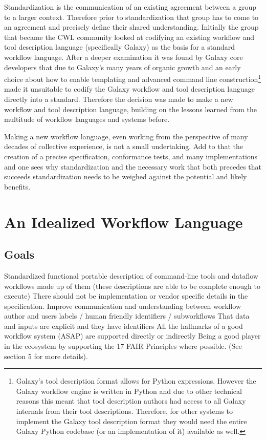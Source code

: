 Standardization is the communication of an existing agreement between a group to a larger context. Therefore prior to standardization that group has to come to an agreement and precisely define their shared understanding. Initially the group that became the CWL community looked at codifying an existing workflow and tool description language (specifically Galaxy) as the basis for a standard workflow language. After a deeper examination it was found by Galaxy core developers that due to Galaxy’s many years of organic growth and an early choice about how to enable templating and advanced command line construction\footnote{Galaxy’s tool description format allows for Python expressions. However the Galaxy workflow engine is written in Python and due to other technical reasons this meant that tool description authors had access to all Galaxy internals from their tool descriptions. Therefore, for other systems to implement the Galaxy tool description format they would need the entire Galaxy Python codebase (or an implementation of it) available as well.} made it unsuitable to codify the Galaxy workflow and tool description language directly into a standard. Therefore the decision was made to make a new workflow and tool description language, building on the lessons learned from the multitude of workflow languages and systems before.

Making a new workflow language, even working from the perspective of many decades of collective experience, is not a small undertaking. Add to that the creation of a precise specification, conformance tests, and many implementations and one sees why standardization and the necessary work that both precedes that succeeds standardization needs to be weighed against the potential and likely benefits.

\section{An Idealized Workflow Language}

\subsection{Goals}
Standardized functional portable description of command-line tools and dataflow workflows made up of them
(these descriptions are able to be complete enough to execute)
There should not be implementation or vendor specific details in the specification.
Improve communication and understanding between workflow author and users labels / human friendly identifiers / subworkflows
That data and inputs are explicit and they have identifiers
All the hallmarks of a good workflow system (ASAP) are supported directly or indirectly
Being a good player in the ecosystem by supporting the 17 FAIR Principles where possible. (See section 5 for more details).

